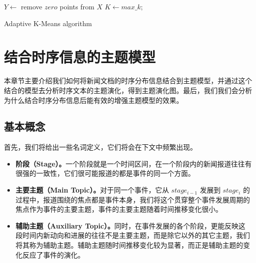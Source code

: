 \begin{algorithm}
  \DontPrintSemicolon
  \BlankLine
  $Y \longleftarrow$ remove $zero$ points from $X$\;
   {$K \leftarrow max\_k$;\;}
  \caption{Adaptive K-Means algorithm}
  \label{algo:ada-kmeans}
\end{algorithm}

\section{结合时序信息的主题模型}
本章节主要介绍我们如何将新闻文档的时序分布信息结合到主题模型，并通过这个结合的模型去分析时序文本的主题演化，得到主题演化图。最后，我们我们会分析为什么结合时序分布信息后能有效的增强主题模型的效果。
\subsection{基本概念}
\label{sec:concepts}
首先，我们将给出一些名词定义，它们将会在下文中频繁出现。
\begin{itemize}
\item \textbf{阶段（Stage）。}一个阶段就是一个时间区间，在一个阶段内的新闻报道往往有很强的一致性，它们很可能报道的都是事件的同一个方面。
\item \textbf{主要主题（Main Topic）。}对于同一个事件，它从 $stage_{i-1}$ 发展到 $stage_i$  的过程中，报道围绕的焦点都是事件本身，我们将这个贯穿整个事件发展周期的焦点作为事件的主要主题，事件的主要主题随着时间推移变化很小。
\item \textbf{辅助主题（Auxiliary Topic）。}同时，在事件发展的各个阶段，更能反映这段时间内新动向和进展的往往不是主要主题，而是除它以外的其它主题，我们将其称为辅助主题。辅助主题随时间推移变化较为显著，而正是辅助主题的变化反应了事件的演化。
\end{itemize}

